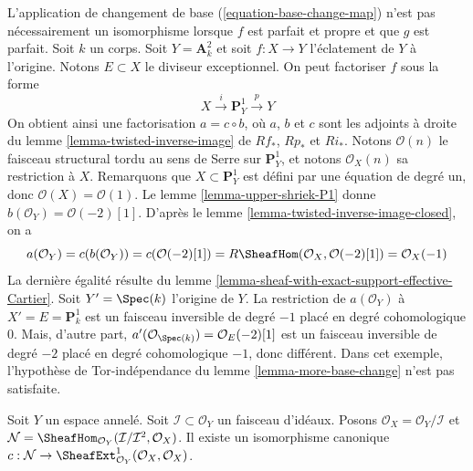 \begin{example}
\label{example-base-change-wrong}
L'application de changement de base (\ref{equation-base-change-map}) n'est pas nécessairement un isomorphisme lorsque $f$ est parfait et propre et que $g$ est parfait. Soit $k$ un corps. Soit $Y = \mathbf{A}^2_k$ et soit $f : X \to Y$ l'éclatement de $Y$ à l'origine. Notons $E \subset X$ le diviseur exceptionnel. On peut factoriser $f$ sous la forme
$$
X \xrightarrow{i} \mathbf{P}^1_Y \xrightarrow{p} Y
$$
On obtient ainsi une factorisation $a = c \circ b$, où $a$, $b$ et $c$ sont les adjoints à droite du lemme \ref{lemma-twisted-inverse-image} de $Rf_*$, $Rp_*$ et $Ri_*$. Notons $\mathcal{O}(n)$ le faisceau structural tordu au sens de Serre sur $\mathbf{P}^1_Y$, et notons $\mathcal{O}_X(n)$ sa restriction à $X$. Remarquons que $X \subset \mathbf{P}^1_Y$ est défini par une équation de degré un, donc $\mathcal{O}(X) = \mathcal{O}(1)$. Le lemme \ref{lemma-upper-shriek-P1} donne $b(\mathcal{O}_Y) = \mathcal{O}(-2)[1]$. D'après le lemme \ref{lemma-twisted-inverse-image-closed}, on a
$$
a(\mathcal{O}_Y) = c(b(\mathcal{O}_Y)) =
c(\mathcal{O}(-2)[1]) =
R\SheafHom(\mathcal{O}_X, \mathcal{O}(-2)[1]) =
\mathcal{O}_X(-1)
$$
La dernière égalité résulte du lemme \ref{lemma-sheaf-with-exact-support-effective-Cartier}. Soit $Y' = \Spec(k)$ l'origine de $Y$. La restriction de $a(\mathcal{O}_Y)$ à $X' = E = \mathbf{P}^1_k$ est un faisceau inversible de degré $-1$ placé en degré cohomologique $0$. Mais, d'autre part,
$a'(\mathcal{O}_{\Spec(k)}) = \mathcal{O}_E(-2)[1]$
est un faisceau inversible de degré $-2$ placé en degré cohomologique $-1$, donc différent. Dans cet exemple, l'hypothèse de Tor-indépendance du lemme \ref{lemma-more-base-change} n'est pas satisfaite.
\end{example}

\begin{lemma}
\label{lemma-ext}
Soit $Y$ un espace annelé. Soit $\mathcal{I} \subset \mathcal{O}_Y$ un faisceau d'idéaux. Posons $\mathcal{O}_X = \mathcal{O}_Y/\mathcal{I}$ et $\mathcal{N} =
\SheafHom_{\mathcal{O}_Y}(\mathcal{I}/\mathcal{I}^2, \mathcal{O}_X)$. Il existe un isomorphisme canonique $c : \mathcal{N} \to
\SheafExt^1_{\mathcal{O}_Y}(\mathcal{O}_X, \mathcal{O}_X)
$.
\end{lemma}

